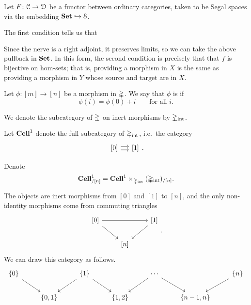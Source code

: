 \documentclass[main.tex]{subfiles}
\begin{document}
\begin{example}
  Let $F\colon \mathcal{C} \to \mathcal{D}$ be a functor between ordinary categories, taken to be Segal spaces via the embedding $\mathbf{Set} \hookrightarrow \mathcal{S}$.

  The first condition tells us that

  Since the nerve is a right adjoint, it preserves limits, so we can take the above pullback in $\mathbf{Set}$. In this form, the second condition is precisely that that $f$ is bijective on hom-sets; that is, providing a morphism in $X$ is the same as providing a morphism in $Y$ whose source and target are in $X$.
\end{example}

\begin{definition}
  \label{def:inert_morphism}
  Let $\phi\colon [m] \to [n]$ be a morphism in $\mathbb{\Delta}$. We say that $\phi$ is  if
  \begin{equation*}
    \phi(i) = \phi(0) + i \qquad \text{for all }i.
  \end{equation*}

  We denote the subcategory of $\mathbb{\Delta}$ on inert morphisms by $\mathbb{\Delta}_{\mathrm{int}}$.
\end{definition}

Let $\mathbf{Cell}^{1}$ denote the full subcategory of $\mathbb{\Delta}_{\mathrm{int}}$, i.e.\ the category
\begin{equation*}
  \begin{tikzcd}[column sep=small]
    {[0]}
    \arrow[r, shift left]
    \arrow[r, shift right]
    & {[1]}
  \end{tikzcd}.
\end{equation*}

Denote
\begin{equation*}
  \mathbf{Cell}^{1}_{/[n]} = \mathbf{Cell}^{1} \times_{\mathbb{\Delta}_{\mathrm{int}}} (\mathbb{\Delta}_{\mathrm{int}})_{/[n]}.
\end{equation*}

The objects are inert morphisms from $[0]$ and $[1]$ to $[n]$, and the only non-identity morphisms come from commuting triangles
\begin{equation*}
  \begin{tikzcd}
    {[0]}
    \arrow[rr]
    \arrow[dr]
    && {[1]}
    \arrow[dl]
    \\
    & {[n]}
  \end{tikzcd}.
\end{equation*}
We can draw this category as follows.
\begin{equation*}
  \begin{tikzcd}
    \{0\}
    \arrow[dr]
    && \{1\}
    \arrow[dl]
    \arrow[dr]
    && \cdots
    \arrow[dl]
    \arrow[dr]
    && \{n\}
    \arrow[dl]
    \\
    & \{0, 1\}
    && \{1, 2\}
    && \{n-1,n\}
  \end{tikzcd}
\end{equation*}
\end{document}

